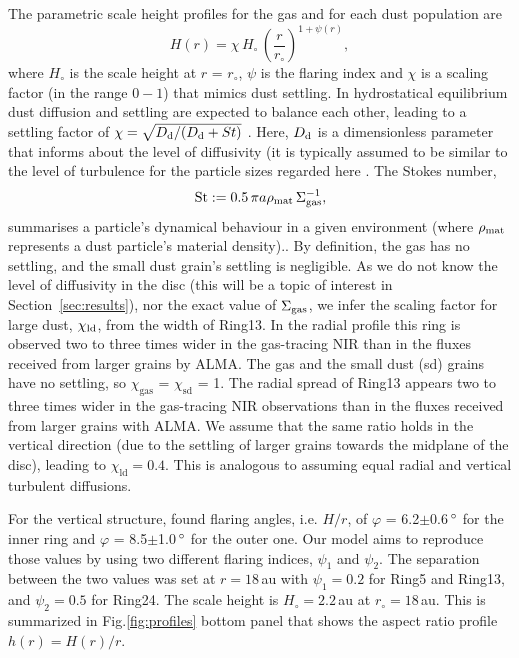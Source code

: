 \documentclass[fleqn,usenatbib,useAMS]{mnras}
\begin{document}
The parametric scale height profiles for the gas and for each dust population are 
\begin{equation}
    \label{scale}
  H(r)=\chi \, H_{\circ} \,\left( \frac{r}{r_{\circ}}\right)^{1+\psi(r)},
\end{equation}
where $H_\circ$ is the scale height at $r$ = $r_\circ$, $\psi$ is the flaring index and $\chi$ is a scaling factor (in the range $0-1$) that mimics dust settling. In hydrostatical equilibrium dust diffusion and settling are expected to balance each other, leading to a settling factor of $\chi = \sqrt{D_{\rm d}/(D_{\rm d} + St)}$ \citep{Dubrulle1995}. Here, $D_{\rm d}$ is a dimensionless parameter that informs about the level of diffusivity (it is typically assumed to be similar to the level of turbulence for the particle sizes regarded here \citep{2007Icar..192..588Y}. The Stokes number,
\begin{equation}
    {\rm St} := 0.5 \,\pi a \rho_{\rm mat} \, \Sigma_{\rm gas}^{-1}, 
\end{equation}
summarises a particle's dynamical behaviour in a given environment (where $\rho_{\rm mat}$ represents a dust particle's material density).. By definition, the gas has no settling, and the small dust grain's settling is negligible. As we do not know the level of diffusivity in the disc (this will be a topic of interest in Section~\ref{sec:results}), nor the exact value of $\Sigma_{\rm gas}$, we infer the scaling factor for large dust, $\chi_{\rm ld}$, from the width of Ring13. In the radial profile this ring is observed two to three times wider in the gas-tracing NIR than in the fluxes received from larger grains by ALMA. The gas and the small dust (sd) grains have no settling, so $\chi_{\mathrm{gas}}$ = $\chi_{\mathrm{sd}}$ = 1. The radial spread of Ring13 appears two to three times wider in the gas-tracing NIR observations than in the fluxes received from larger grains with ALMA. We assume that the same ratio holds in the vertical direction (due to the settling of larger grains towards the midplane of the disc), leading to $\chi_{\mathrm{ld}}=0.4$. This is analogous to assuming equal radial and vertical turbulent diffusions.

For the vertical structure, \citet{dOrazi} found flaring angles, i.e. $H/r$, of $\varphi$ = 6.2$\pm$0.6\,$\hbox{$^\circ$}$ for the inner ring and $\varphi$ = 8.5$\pm$1.0\,$\hbox{$^\circ$}$ for the outer one. Our model aims to reproduce those values by using two different flaring indices, $\psi_1$ and $\psi_2$. The separation between the two values was set at $r = 18$\,au with $\psi_1=0.2$ for Ring5 and Ring13, and $\psi_2=0.5$ for Ring24. The scale height is $H_\circ = 2.2$\,au at $r_\circ = 18$\,au. This is summarized in Fig.\ref{fig:profiles} bottom panel that shows the aspect ratio profile $h(r)=H(r)/r$. 
\end{document}
